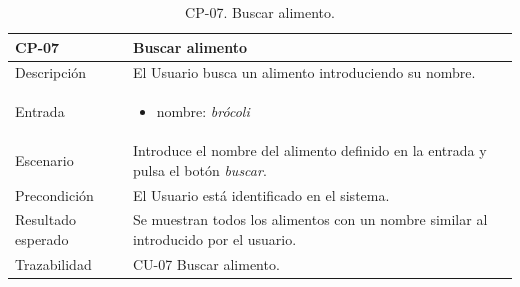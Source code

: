     \begin{table}[H]
        \centering
        \begin{tabularx}{1\textwidth} { 
            | >{\raggedright\arraybackslash}X 
            | >{\raggedright\arraybackslash}X 
            | >{\raggedright\arraybackslash}X 
            |  }
        \hline
        \textbf{CP-07}     & \textbf{Buscar alimento}                             \\ \hline
        Descripción        & El Usuario busca un alimento introduciendo su nombre.      \\ \hline
        Entrada            & \begin{itemize}
            \item nombre: \textit{brócoli}
        \end{itemize}\\ \hline
        Escenario          & Introduce el nombre del alimento definido en la entrada y pulsa el botón \textit{buscar}.                            \\ \hline
        Precondición          & El Usuario está identificado en el sistema.                             \\ \hline
        
        Resultado esperado & Se muestran todos los alimentos con un nombre similar al introducido por el usuario. \\ \hline
        Trazabilidad & CU-07 Buscar alimento. \\ \hline
    \end{tabularx}
    \caption{CP-07. Buscar alimento.}
    \label{table:CP-07}
        \end{table}


